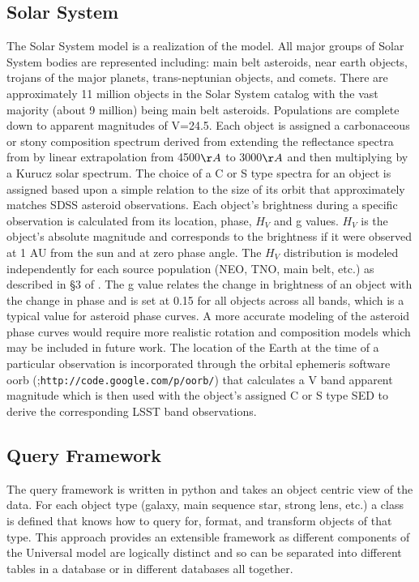 \documentclass[]{article}
\begin{document}
{\subsection{Solar System \label{sec:ssm}}

The Solar System model is a realization of the \citet{grav11} model.
All major groups of Solar System bodies are represented including:
main belt asteroids, near earth objects, trojans of the major planets,
trans-neptunian objects, and comets. There are approximately 11
million objects in the Solar System catalog with the vast majority (about 9 million) being
main belt asteroids. Populations are complete down to apparent
magnitudes of V=24.5.  Each object is assigned a carbonaceous or stony
composition spectrum derived from extending the reflectance spectra
from \citet{demeo} by linear extrapolation from 4500$\AA$ to 3000$\AA$
and then multiplying by a Kurucz solar spectrum. The choice of a
C or S type spectra for an object is assigned based upon a simple
relation to the size of its orbit that approximately matches SDSS
asteroid observations. Each object's brightness during a specific
observation is calculated from its location, phase, $H_V$ and g
values. $H_V$ is the object's absolute magnitude and corresponds to the
brightness if it were observed at 1 AU from the sun and at zero phase
angle.  The $H_V$ distribution is modeled independently for each
source population (NEO, TNO, main belt, etc.)  as described in \S 3 of
\citet{grav11}.  The g value relates the change in brightness of an
object with the change in phase and is set at 0.15 for all objects
across all bands, which is a typical value for asteroid phase curves.
A more accurate modeling of the asteroid phase curves would require
more realistic rotation and composition models which may be included
in future work.  The location of the Earth at the time of a
particular observation is incorporated through the orbital ephemeris software oorb
(\citet{granvik};{\tt http://code.google.com/p/oorb/}) that calculates a V
band apparent magnitude which is then used with the object's assigned
C or S type SED to derive the corresponding LSST band observations.

\subsection{Query Framework}
The query framework is written in python and takes an object centric view of the 
data.  For each object type (galaxy, main sequence star, strong lens, etc.) a class
is defined that knows how to query for, format, and transform objects of that type.  
This approach provides an extensible framework as different components of the Universal model
are logically distinct and so can be separated into different tables in a database
or in different databases all together.

}
\end{document}
